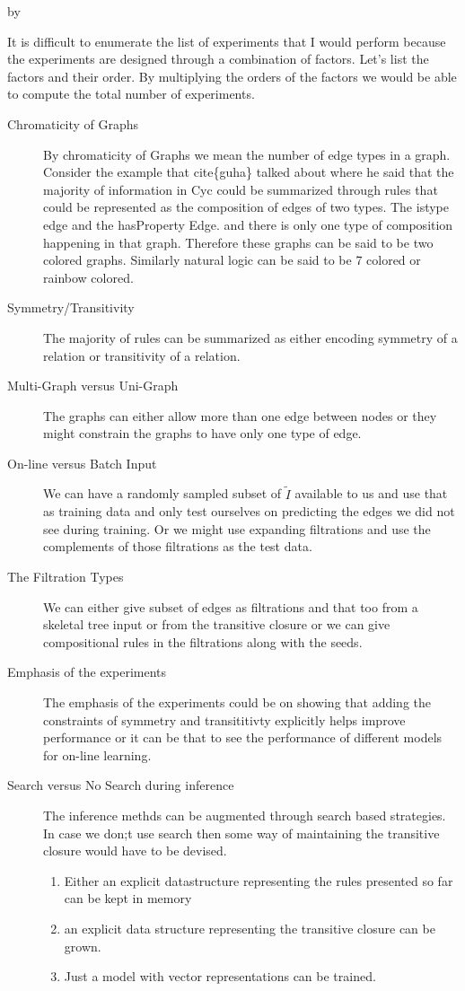 \documentclass[12pt,answers]{exam} %
\makeatletter
\renewcommand{\cite}[1]{cite\{#1\}}
\def\SetTotalwidth{\advance\linewidth by \@totalleftmargin
\@totalleftmargin=0pt}
\newcommand{\answer}[1]{
\ifprintanswers
\SetTotalwidth
  \begin{solution}[0in]#1\end{solution}
\else \fi
}
\makeatother
\begin{document}
\begin{questions}
\answer{
It is difficult to enumerate the list of experiments that I would
perform because the experiments are designed through a combination of
factors. Let's list the factors and their order. By multiplying the
orders of the factors we would be able to compute the total number of
experiments.
\begin{description}
\item [Chromaticity of Graphs]
  By chromaticity of Graphs we mean the number of edge types in a
  graph. Consider the example that \cite{guha} talked about where he
  said that the majority of information in Cyc could be summarized
  through rules that could be represented as the composition of edges
  of two types. The istype edge and the hasProperty Edge. and there is
  only one type of composition happening in that graph. Therefore
  these graphs can be said to be two colored graphs. Similarly natural
  logic can be said to be 7 colored or rainbow colored.
\item [Symmetry/Transitivity] The majority of rules can be summarized
  as either encoding symmetry of a relation or transitivity of a relation.
\item [Multi-Graph versus Uni-Graph] The graphs can either allow more
  than one edge between nodes or they might constrain the graphs to
  have only one type of edge.
\item[On-line versus Batch Input] We can have a randomly sampled
  subset of $\tilde{I}$ available to us and use that as training data
  and only test ourselves on predicting the edges we did not see
  during training. Or we might use expanding filtrations and use the
  complements of those filtrations as the test data.
\item [The Filtration Types] We can either give subset of edges as
  filtrations and that too from a skeletal tree input or from the
  transitive closure or we can give compositional rules in the
  filtrations along with the seeds.
\item [Emphasis of the experiments] The emphasis of the experiments
  could be on showing that adding the constraints of symmetry and
  transititivty explicitly helps improve performance or it can be that
  to see the performance of different models for on-line learning.
\item [Search versus No Search during inference] The inference methds
  can be augmented through search based strategies. In case we don;t
  use search then some way of maintaining the transitive closure would
  have to be devised.
  \begin{enumerate}
  \item Either an explicit datastructure representing
    the rules presented so far can be kept in memory
  \item an explicit data structure representing the transitive closure
    can be grown.
  \item Just a model with vector representations can be trained.
  \end{enumerate}
\end{description}
}


\end{questions}
\end{document}
